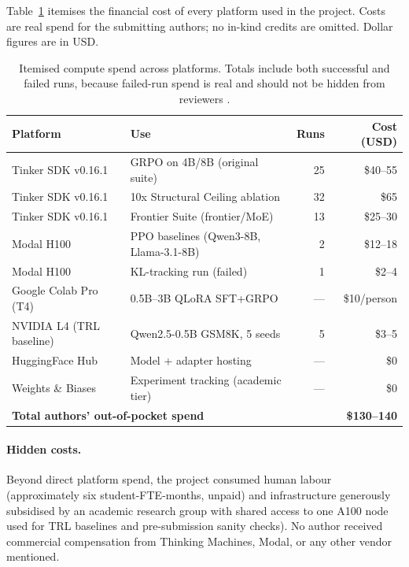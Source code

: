 \documentclass{article}
\begin{document}
Table~\ref{tab:compute_spend} itemises the financial cost of every
platform used in the project. Costs are real spend for the submitting
authors; no in-kind credits are omitted. Dollar figures are in USD.

\begin{table}[ht]
\centering
\small
\caption{Itemised compute spend across platforms. Totals include both
successful and failed runs, because failed-run spend is real and should
not be hidden from reviewers \cite{henderson2018deep}.}
\label{tab:compute_spend}
\begin{tabular}{llrr}
\toprule
\textbf{Platform} & \textbf{Use} & \textbf{Runs} & \textbf{Cost (USD)} \\
\midrule
Tinker SDK v0.16.1 & GRPO on 4B/8B (original suite)        & 25 & \$40--55 \\
Tinker SDK v0.16.1 & 10x Structural Ceiling ablation       & 32 & \$65 \\
Tinker SDK v0.16.1 & Frontier Suite (frontier/MoE)      & 13 & \$25--30 \\
Modal H100         & PPO baselines (Qwen3-8B, Llama-3.1-8B)& 2  & \$12--18 \\
Modal H100         & KL-tracking run (failed)              & 1  & \$2--4   \\
Google Colab Pro (T4) & 0.5B--3B QLoRA SFT+GRPO            & --- & \$10/person \\
NVIDIA L4 (TRL baseline)& Qwen2.5-0.5B GSM8K, 5 seeds      & 5  & \$3--5   \\
HuggingFace Hub    & Model + adapter hosting               & --- & \$0 \\
Weights \& Biases  & Experiment tracking (academic tier)   & --- & \$0 \\
\midrule
\multicolumn{3}{l}{\textbf{Total authors' out-of-pocket spend}} & \textbf{\$130--140} \\
\bottomrule
\end{tabular}
\end{table}

\paragraph{Hidden costs.} Beyond direct platform spend, the project
consumed human labour (approximately six student-FTE-months, unpaid) and
infrastructure generously subsidised by an academic research group with
shared access to one A100 node used for TRL baselines and
pre-submission sanity checks). No author received commercial compensation
from Thinking Machines, Modal, or any other vendor mentioned.
\end{document}
